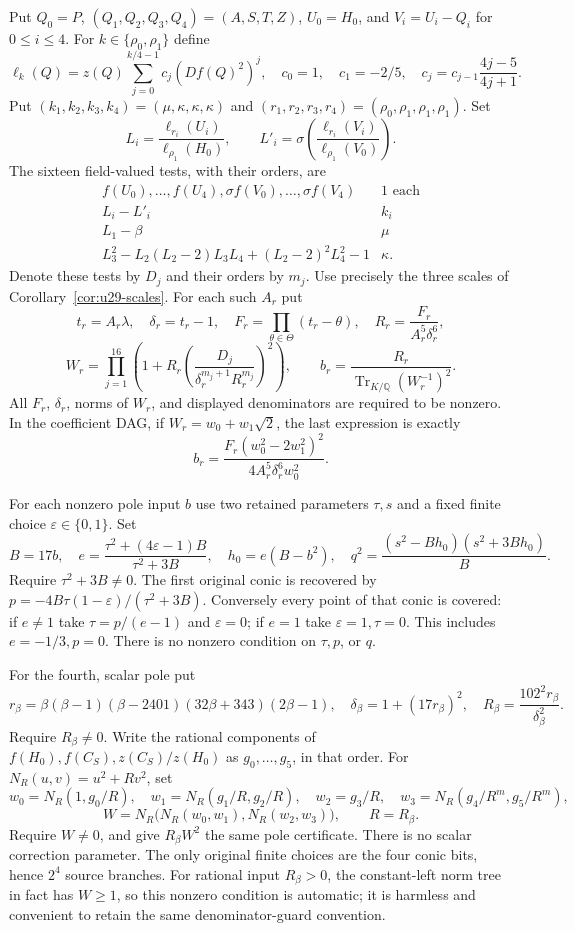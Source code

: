 \documentclass[11pt,a4paper]{article}
\theoremstyle{definition}
\theoremstyle{remark}
\begin{document}
Put $Q_0=P$, $(Q_1,Q_2,Q_3,Q_4)=(A,S,T,Z)$,
$U_0=H_0$, and $V_i=U_i-Q_i$ for $0\le i\le4$.
For $k\in\{\rho_0,\rho_1\}$ define
\[
 \ell_k(Q)=z(Q)\sum_{j=0}^{k/4-1}c_j(Df(Q)^2)^j,
 \quad c_0=1,\quad c_1=-2/5,\quad
 c_j=c_{j-1}\frac{4j-5}{4j+1}.
\]
Put $(k_1,k_2,k_3,k_4)=(\mu,\kappa,\kappa,\kappa)$ and
$(r_1,r_2,r_3,r_4)=(\rho_0,\rho_1,\rho_1,\rho_1)$.  Set
\[
 L_i=\frac{\ell_{r_i}(U_i)}{\ell_{\rho_1}(H_0)},\qquad
 L'_i=\sigma\left(\frac{\ell_{r_i}(V_i)}{\ell_{\rho_1}(V_0)}\right).
\]
The sixteen field-valued tests, with their orders, are
\[
 \begin{array}{c|c}
 f(U_0),\ldots,f(U_4),\sigma f(V_0),\ldots,\sigma f(V_4)&1\text{ each}\\
 L_i-L'_i&k_i\\
 L_1-\beta&\mu\\
 L_3^2-L_2(L_2-2)L_3L_4+(L_2-2)^2L_4^2-1&\kappa.
 \end{array}
\]
Denote these tests by $D_j$ and their orders by $m_j$.
Use precisely the three scales of Corollary~\ref{cor:u29-scales}.
For each such $A_r$ put
\[
 t_r=A_r\lambda,\quad \delta_r=t_r-1,\quad
 F_r=\prod_{\theta\in\Theta}(t_r-\theta),\quad
 R_r=\frac{F_r}{A_r^5\delta_r^6},
\]
\[
 W_r=\prod_{j=1}^{16}
 \left(1+R_r\left(\frac{D_j}{\delta_r^{m_j+1}R_r^{m_j}}\right)^2\right),
 \qquad b_r=\frac{R_r}{\operatorname{Tr}_{K/\mathbb Q}(W_r^{-1})^2}.
\]
All $F_r$, $\delta_r$, norms of $W_r$, and displayed denominators
are required to be nonzero.  In the coefficient DAG, if
$W_r=w_0+w_1\sqrt2$, the last expression is exactly
\[
 b_r=\frac{F_r(w_0^2-2w_1^2)^2}
              {4A_r^5\delta_r^6w_0^2}.
\]

For each nonzero pole input $b$ use two retained parameters $\tau,s$
and a fixed finite choice $\varepsilon\in\{0,1\}$.  Set
\[
 B=17b,\quad e=\frac{\tau^2+(4\varepsilon-1)B}{\tau^2+3B},
 \quad h_0=e(B-b^2),\quad
 q^2=\frac{(s^2-Bh_0)(s^2+3Bh_0)}{B}.
\]
Require $\tau^2+3B\ne0$.  The first original conic is recovered by
$p=-4B\tau(1-\varepsilon)/(\tau^2+3B)$.
Conversely every point of that conic is covered: if $e\ne1$ take
$\tau=p/(e-1)$ and $\varepsilon=0$; if $e=1$ take
$\varepsilon=1,\tau=0$.  This includes $e=-1/3,p=0$.
There is no nonzero condition on $\tau,p$, or $q$.

For the fourth, scalar pole put
\[
 r_\beta=\beta(\beta-1)(\beta-2401)(32\beta+343)(2\beta-1),\quad
 \delta_\beta=1+(17r_\beta)^2,\quad
 R_\beta=\frac{102^2r_\beta}{\delta_\beta^2}.
\]
Require $R_\beta\ne0$.  Write the rational components of
$f(H_0),f(C_S),z(C_S)/z(H_0)$ as $g_0,\ldots,g_5$, in that order.
For $N_R(u,v)=u^2+Rv^2$, set
\[
 w_0=N_R(1,g_0/R),\quad
 w_1=N_R(g_1/R,g_2/R),\quad w_2=g_3/R,
 \quad w_3=N_R(g_4/R^m,g_5/R^m),
\]
\[
              W=N_R\bigl(N_R(w_0,w_1),N_R(w_2,w_3)\bigr),
              \qquad R=R_\beta.
\]
Require $W\ne0$, and give $R_\beta W^2$ the same pole certificate.
There is no scalar correction parameter.  The only original finite
choices are the four conic bits, hence $2^4$ source branches.
For rational input $R_\beta>0$, the constant-left norm tree in fact
has $W\ge1$, so this nonzero condition is automatic; it is harmless
and convenient to retain the same denominator-guard convention.
\end{document}
